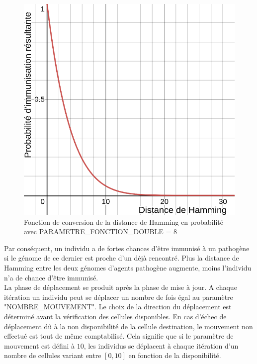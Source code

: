 \begin{figure}[h]
\begin{minipage}[b]{0.4\textwidth}
    \includegraphics[width=\textwidth]{Images/doubleHamming8.png}
    \caption[Fonction (double) de converstion en probabilité (facteur 8)]{Fonction de conversion de la distance de Hamming en probabilité avec {\small PARAMETRE\_FONCTION\_DOUBLE} = $8$}
  \end{minipage}
\end{figure}

Par conséquent, un individu a de fortes chances d'être immunisé à un pathogène si le génome de ce dernier est proche d'un déjà rencontré. Plus la distance de Hamming entre les deux génomes d'agents pathogène augmente, moins l'individu n'a de chance d'être immunisé.\\

La phase de déplacement se produit après la phase de mise à jour. A chaque itération un individu peut se déplacer un nombre de fois égal au paramètre {\small "NOMBRE\_MOUVEMENT"}. Le choix de la direction du déplacement est déterminé avant la vérification des cellules disponibles. En cas d'échec de déplacement dû à la non disponibilité de la cellule destination, le mouvement non effectué est tout de même comptabilisé. Cela signifie que si le paramètre de mouvement est défini à $10$, les individus se déplacent à chaque itération d'un nombre de cellules variant entre $[0,10]$ en fonction de la disponibilité.\\

